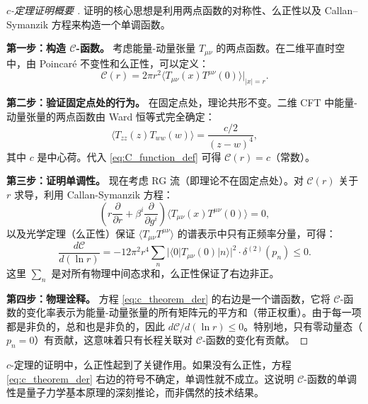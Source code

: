 \begin{proof}[$c$-定理证明概要 \cite{Zamolodchikov1986}]
证明的核心思想是利用两点函数的对称性、么正性以及 Callan--Symanzik 方程来构造一个单调函数。

\textbf{第一步：构造 $\mathcal{C}$-函数。} 考虑能量-动量张量 $T_{\mu\nu}$ 的两点函数。在二维平直时空中，由 Poincar\'e 不变性和么正性，可以定义：
\begin{equation}\label{eq:C_function_def}
    \mathcal{C}(r) = 2\pi r^2 \langle T_{\mu\nu}(x) T^{\mu\nu}(0)\rangle\big|_{|x|=r}.
\end{equation}

\textbf{第二步：验证固定点处的行为。} 在固定点处，理论共形不变。二维 CFT 中能量-动量张量的两点函数由 Ward 恒等式完全确定：
\begin{equation}
    \langle T_{zz}(z) T_{ww}(w)\rangle = \frac{c/2}{(z-w)^4},
\end{equation}
其中 $c$ 是中心荷。代入 \eqref{eq:C_function_def} 可得 $\mathcal{C}(r) = c$（常数）。

\textbf{第三步：证明单调性。} 现在考虑 RG 流（即理论不在固定点处）。对 $\mathcal{C}(r)$ 关于 $r$ 求导，利用 Callan-Symanzik 方程：
\begin{equation}
    \left(r\frac{\partial}{\partial r} + \beta^i\frac{\partial}{\partial g^i}\right)\langle T_{\mu\nu}(x) T^{\mu\nu}(0)\rangle = 0,
\end{equation}
以及光学定理（么正性）保证 $\langle T_{\mu\nu} T^{\mu\nu}\rangle$ 的谱表示中只有正频率分量，可得：
\begin{equation}\label{eq:c_theorem_der}
    \frac{d\mathcal{C}}{d(\ln r)} = -12\pi^2 r^4 \sum_n |\langle 0|T_{\mu\nu}(0)|n\rangle|^2 \cdot \delta^{(2)}(p_n) \leq 0.
\end{equation}
这里 $\sum_n$ 是对所有物理中间态求和，么正性保证了右边非正。

\textbf{第四步：物理诠释。} 方程 \eqref{eq:c_theorem_der} 的右边是一个谱函数，它将 $\mathcal{C}$-函数的变化率表示为能量-动量张量的所有矩阵元的平方和（带正权重）。由于每一项都是非负的，总和也是非负的，因此 $d\mathcal{C}/d(\ln r) \leq 0$。特别地，只有零动量态（$p_n = 0$）有贡献，这意味着只有长程关联对 $\mathcal{C}$-函数的变化有贡献。
\end{proof}

\begin{remark}
$c$-定理的证明中，么正性起到了关键作用。如果没有么正性，方程 \eqref{eq:c_theorem_der} 右边的符号不确定，单调性就不成立。这说明 $\mathcal{C}$-函数的单调性是量子力学基本原理的深刻推论，而非偶然的技术结果。
\end{remark}

